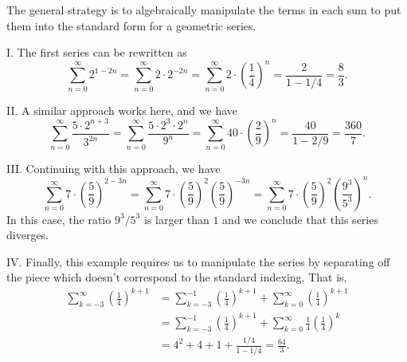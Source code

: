 \documentclass[]{ximera}
\begin{document}
\begin{freeResponse}
The general strategy is to algebraically manipulate the terms in each sum to put them into the standard form for a geometric series.

I. The first series can be rewritten as 
$$
\sum_{n=0}^\infty 2^{1-2n} = \sum_{n=0}^\infty 2 \cdot 2^{-2n} = \sum_{n=0}^\infty 2 \cdot \left(\frac{1}{4}\right)^n = \frac{2}{1-1/4} = \frac{8}{3}.
$$

II. A similar approach works here, and we have
$$
\sum_{n=0}^\infty \frac{5 \cdot 2^{n+3}}{3^{2n}} = \sum_{n=0}^\infty \frac{5 \cdot 2^3 \cdot 2^n}{9^n} = \sum_{n=0}^\infty 40 \cdot \left(\frac{2}{9}\right)^n = \frac{40}{1-2/9} = \frac{360}{7}.
$$

III. Continuing with this approach, we have
$$
\sum_{n=0}^\infty 7 \cdot \left(\frac{5}{9}\right)^{2-3n} = \sum_{n=0}^\infty 7 \cdot \left(\frac{5}{9}\right)^2 \left(\frac{5}{9}\right)^{-3n} = \sum_{n=0}^\infty 7 \cdot \left(\frac{5}{9}\right)^2 \left(\frac{9^3}{5^3}\right)^{n}.
$$
In this case, the ratio $9^3/5^3$ is larger than $1$ and we conclude that this series diverges.

IV. Finally, this example requires us to manipulate the series by separating off the piece which doesn't correspond to the standard indexing. That is, 
\begin{align*}
\sum_{k=-3}^\infty \left(\frac{1}{4}\right)^{k+1} &= \sum_{k=-3}^{-1} \left(\frac{1}{4}\right)^{k+1} + \sum_{k=0}^\infty \left(\frac{1}{4}\right)^{k+1} \\
&= \sum_{k=-3}^{-1} \left(\frac{1}{4}\right)^{k+1} + \sum_{k=0}^\infty \frac{1}{4} \left(\frac{1}{4}\right)^{k} \\
&= 4^2 + 4 + 1 + \frac{1/4}{1-1/4} = \frac{64}{3}.
\end{align*}
\end{freeResponse}
\end{document}
